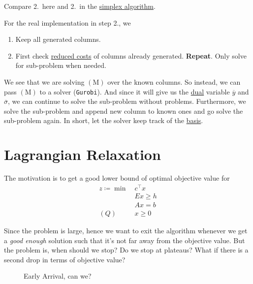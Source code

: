 \begin{note}
	Compare 2.\ here and 2.\ in the \hyperref[algo:simplex-algorithm]{simplex algorithm}.
\end{note}
\begin{remark}
	For the real implementation in step 2., we
	\begin{enumerate}
		\item Keep all generated columns.
		\item First check \hyperref[def:reduced-cost]{reduced costs} of columns already generated. \textbf{Repeat}. Only solve for sub-problem when needed.
	\end{enumerate}

	\begin{note}
		We see that we are solving \((\mathrm{M})\) over the known columns. So instead, we can pass \((\mathrm{M})\) to a solver (\texttt{Gurobi}). And since it will give us the \hyperref[def:dual]{dual} variable \(\overline{y}\) and \(\overline{\sigma}\), we can continue to solve the sub-problem without problems. Furthermore, we solve the sub-problem and append new column to known ones and go solve the sub-problem again. In short, let the solver keep track of the \hyperref[def:basis]{basis}.
	\end{note}
\end{remark}

\section{Lagrangian Relaxation}
The motivation is to get a good lower bound of optimal objective value for
\[
	\begin{aligned}
		z\coloneqq \min~ & c^{\top}x \\
		                 & Ex \geq h \\
		                 & Ax = b    \\
		(Q)\quad         & x\geq 0
	\end{aligned}
\]

Since the problem is large, hence we want to exit the algorithm whenever we get a \emph{good enough} solution such that it's not far away from the objective value. But the problem is, when should we stop? Do we stop at plateaus? What if there is a second drop in terms of objective value?

\begin{figure}[H]
	\centering
	\caption{Early Arrival, can we?}
	\label{fig:plateau}
\end{figure}

